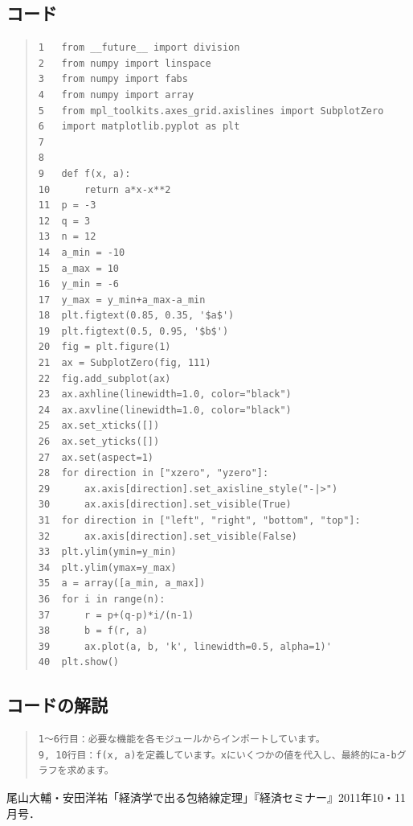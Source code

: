 \documentclass[11pt,a4j,fleqn]{jarticle}
\begin{document}
\subsection{コード}
\begin{quote}
\begin{verbatim}
1  	from __future__ import division
2  	from numpy import linspace
3  	from numpy import fabs
4  	from numpy import array
5  	from mpl_toolkits.axes_grid.axislines import SubplotZero
6  	import matplotlib.pyplot as plt
7  	
8  	
9  	def f(x, a):
10 	    return a*x-x**2
11 	p = -3
12 	q = 3
13 	n = 12
14 	a_min = -10
15 	a_max = 10
16 	y_min = -6
17 	y_max = y_min+a_max-a_min
18 	plt.figtext(0.85, 0.35, '$a$')
19 	plt.figtext(0.5, 0.95, '$b$')
20 	fig = plt.figure(1)
21 	ax = SubplotZero(fig, 111)
22 	fig.add_subplot(ax)
23 	ax.axhline(linewidth=1.0, color="black")
24 	ax.axvline(linewidth=1.0, color="black")
25 	ax.set_xticks([])
26 	ax.set_yticks([])
27 	ax.set(aspect=1)
28 	for direction in ["xzero", "yzero"]:
29 	    ax.axis[direction].set_axisline_style("-|>")
30 	    ax.axis[direction].set_visible(True)
31 	for direction in ["left", "right", "bottom", "top"]:
32 	    ax.axis[direction].set_visible(False)
33 	plt.ylim(ymin=y_min)
34 	plt.ylim(ymax=y_max)
35 	a = array([a_min, a_max])
36 	for i in range(n):
37 	    r = p+(q-p)*i/(n-1)
38 	    b = f(r, a)
39 	    ax.plot(a, b, 'k', linewidth=0.5, alpha=1)'
40 	plt.show()
\end{verbatim}
\end{quote}

\subsection{コードの解説}
\begin{quote}
\begin{verbatim}
1～6行目：必要な機能を各モジュールからインポートしています。
9, 10行目：f(x, a)を定義しています。xにいくつかの値を代入し、最終的にa-bグラフを求めます。
\end{verbatim}
\end{quote}


\begin{thebibliography}{0}
尾山大輔・安田洋祐「経済学で出る包絡線定理」『経済セミナー』2011年10・11月号．
\end{thebibliography}
\end{document}

